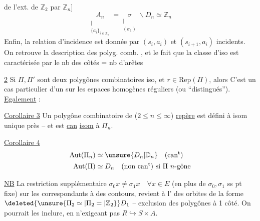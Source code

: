 de l'ext. de $\mathbb Z_2$ par $\mathbb Z_n$]
\[
\underset{\substack{\Vert\\\{a_i\}_{i\in\mathbb Z_n}}}{A_n}=\underset{\substack{\Vert\\(\sigma_1)}}{\sigma}\backslash D_n\simeq\mathbb Z_n
\]
Enfin, la relation d'incidence est donnée
par \qquad $(s_i,a_i)$ et $(s_{i+1},a_i)$ incidents.
On retrouve la description des polyg. comb.
, et le fait que la classe d'iso est
caractérisée par le nb des côtés = nb d'arêtes

\uline{ 2} Si $\Pi,\Pi'$ sont deux polygônes
combinatoires iso,  et $r\in\mathrm{Rep}(\Pi)$,
alors
C'est un cas particulier d'un  sur les
espaces homogènes réguliers (ou ``distingués'').
\uline{Egalement}  :

\uline{Corollaire 3} Un polygône combinatoire de 
($2\leq n\leq\infty$)  \uline{ repère} est défini à
isom unique près -- et est \uline{can} \uline{isom}
à $\Pi_n$.

\uline{Corollaire 4}
\[
\begin{aligned}
\mathrm{Aut}(\Pi_n)&\simeq\unsure{D_n|\mathbb D_n}\quad(\text{can\textsuperscript{t}})\\
\mathrm{Aut}(\Pi)&\simeq D_n\quad(\text{non can\textsuperscript{t}})\ \text{si }\Pi\ n\text{-gône}
\end{aligned}
\]

\uline{NB} La restriction supplémentaire $\sigma_0x\ne\sigma_1x\quad\forall x\in E$
(en plus de $\sigma_0,\sigma_1$ ss pt fixe) sur les
  correspondants à des contours,
revient à l'  des orbites de la
forme $\deleted{\unsure{\Pi_2\simeq|\Pi_2=|\mathbb Z_2}}D_1$ --  exclusion des
polygônes à 1 côté. On pourrait les
inclure, en n'exigeant pas $R\hookrightarrow S\times A$.

